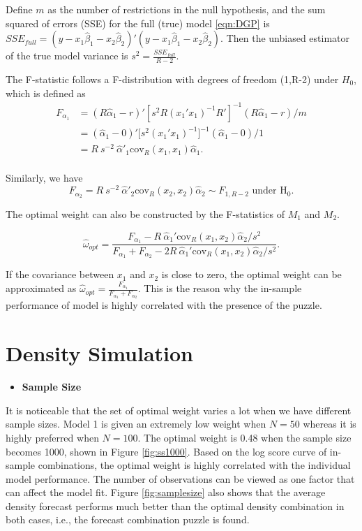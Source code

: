 \documentclass{monashthesis}
\begin{document}
Define \(m\) as the number of restrictions in the null hypothesis, and the sum squared of errors (SSE) for the full (true) model \ref{eqn:DGP} is \(SSE_{full} = (y - x_1 \hat\beta_1 - x_2 \hat\beta_2)'(y - x_1 \hat\beta_1 - x_2 \hat\beta_2)\). Then the unbiased estimator of the true model variance is \(s^2=\frac{SSE_{full}}{R-2}\).

The F-statistic follows a F-distribution with degrees of freedom (1,R-2) under \(H_0\), which is defined as
\begin{align*}
F_{\alpha_1} &= (R\hat\alpha_1 - r)'[s^2R(x_1'x_1)^{-1}R']^{-1}(R\hat\alpha_1 - r)/m \\
&= (\hat\alpha_1 - 0)' \Big[s^2(x_1'x_1)^{-1}\Big]^{-1} (\hat\alpha_1 - 0)/1 \\
&= R \ s^{-2} \ \hat\alpha'_1 \text{cov}_R(x_1,x_1) \hat\alpha_1. \\
\end{align*}

Similarly, we have
\begin{equation*}
F_{\alpha_2} = R \ s^{-2} \ \hat\alpha'_2 \text{cov}_R(x_2,x_2) \hat\alpha_2 \sim F_{1,R-2} \text{ under  H}_0.
\end{equation*}

The optimal weight can also be constructed by the F-statistics of \(M_1\) and \(M_2\).

\begin{equation*}
\hat\omega_{opt} = \frac{F_{\alpha_1}- R \ \hat\alpha_1'\text{cov}_R(x_1,x_2)\hat\alpha_2/s^2}{F_{\alpha_1} + F_{\alpha_2} - 2 R \ \hat\alpha_1'\text{cov}_R(x_1,x_2)\hat\alpha_2/s^2}.
\end{equation*}

If the covariance between \(x_1\) and \(x_2\) is close to zero, the optimal weight can be approximated as \(\hat\omega_{opt} = \frac{F_{\alpha_1}}{F_{\alpha_1} + F_{\alpha_2}}\). This is the reason why the in-sample performance of model is highly correlated with the presence of the puzzle.

\hypertarget{density-simulation}{%
\section{Density Simulation}\label{density-simulation}}

\begin{itemize}
\tightlist
\item
  \bf{Sample Size}
\end{itemize}

It is noticeable that the set of optimal weight varies a lot when we have different sample sizes. Model 1 is given an extremely low weight when \(N=50\) whereas it is highly preferred when \(N=100\). The optimal weight is 0.48 when the sample size becomes 1000, shown in Figure \ref{fig:ss1000}. Based on the log score curve of in-sample combinations, the optimal weight is highly correlated with the individual model performance. The number of observations can be viewed as one factor that can affect the model fit. Figure \ref{fig:samplesize} also shows that the average density forecast performs much better than the optimal density combination in both cases, i.e., the forecast combination puzzle is found.
\end{document}
